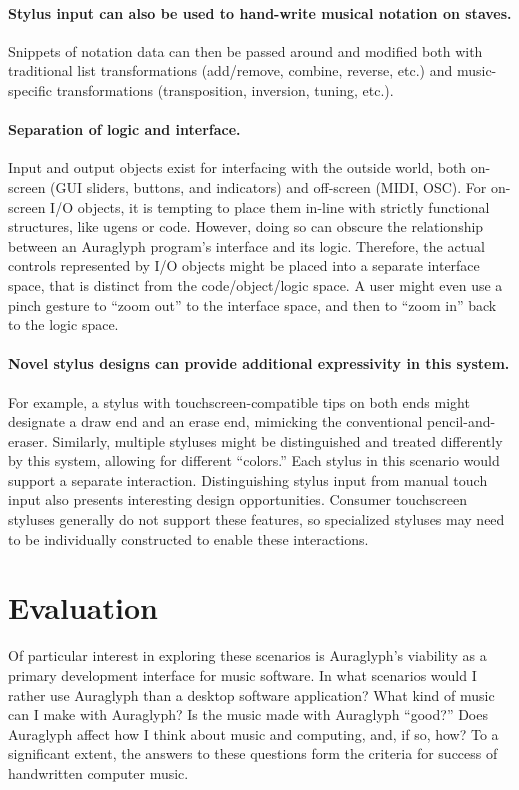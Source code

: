 \documentclass[10pt,letterpaper]{article}
\begin{document}
\paragraph{Stylus input can also be used to hand-write musical notation on staves.}
Snippets of notation data can then be passed around and modified both with traditional list transformations (add/remove, combine, reverse, etc.) and music-specific transformations (transposition, inversion, tuning, etc.). 

\paragraph{Separation of logic and interface.}
Input and output objects exist for interfacing with the outside world, both on-screen (GUI sliders, buttons, and indicators) and off-screen (MIDI, OSC). 
For on-screen I/O objects, it is tempting to place them in-line with strictly functional structures, like ugens or code. 
However, doing so can obscure the relationship between an Auraglyph program's interface and its logic. 
Therefore, the actual controls represented by I/O objects might be placed into a separate interface space, that is distinct from the code/object/logic space. 
A user might even use a pinch gesture to ``zoom out'' to the interface space, and then to ``zoom in'' back to the logic space. 

\paragraph{Novel stylus designs can provide additional expressivity in this system.}
For example, a stylus with touchscreen-compatible tips on both ends might designate a draw end and an erase end, mimicking the conventional pencil-and-eraser. 
Similarly, multiple styluses might be distinguished and treated differently by this system, allowing for different ``colors.''
Each stylus in this scenario would support a separate interaction. 
Distinguishing stylus input from manual touch input also presents interesting design opportunities. 
Consumer touchscreen styluses generally do not support these features, so specialized styluses may need to be individually constructed to enable these interactions. 

\section{Evaluation}
Of particular interest in exploring these scenarios is Auraglyph's viability as a primary development interface for music software. 
In what scenarios would I rather use Auraglyph than a desktop software application? 
What kind of music can I make with Auraglyph? 
Is the music made with Auraglyph ``good?'' 
Does Auraglyph affect how I think about music and computing, and, if so, how? 
To a significant extent, the answers to these questions form the criteria for success of handwritten computer music. 
\end{document}

